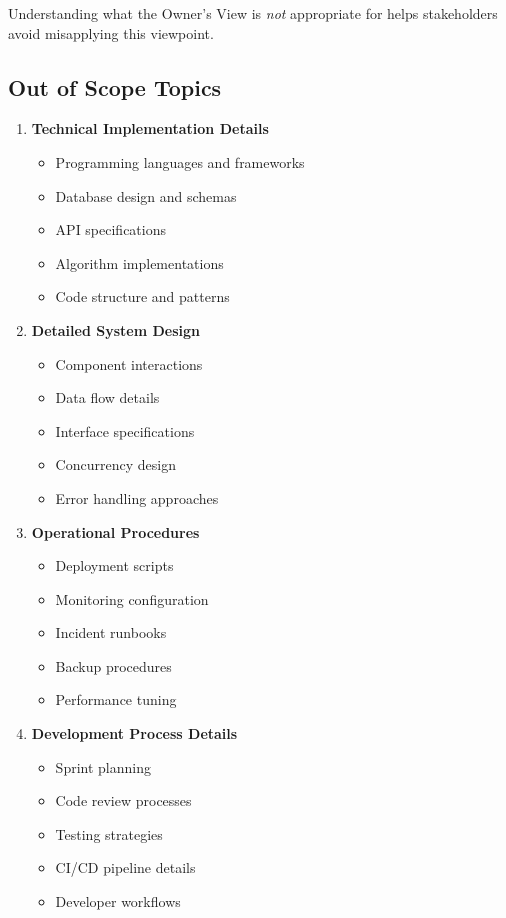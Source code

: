 \documentclass[11pt,letterpaper]{article}
\begin{document}
Understanding what the Owner's View is \emph{not} appropriate for helps stakeholders avoid misapplying this viewpoint.

\subsection{Out of Scope Topics}

\begin{enumerate}[label=\textbf{AC\arabic*:}, leftmargin=2.5em]
    \item \textbf{Technical Implementation Details}
    \begin{itemize}[nosep]
        \item Programming languages and frameworks
        \item Database design and schemas
        \item API specifications
        \item Algorithm implementations
        \item Code structure and patterns
    \end{itemize}
    
    \item \textbf{Detailed System Design}
    \begin{itemize}[nosep]
        \item Component interactions
        \item Data flow details
        \item Interface specifications
        \item Concurrency design
        \item Error handling approaches
    \end{itemize}
    
    \item \textbf{Operational Procedures}
    \begin{itemize}[nosep]
        \item Deployment scripts
        \item Monitoring configuration
        \item Incident runbooks
        \item Backup procedures
        \item Performance tuning
    \end{itemize}
    
    \item \textbf{Development Process Details}
    \begin{itemize}[nosep]
        \item Sprint planning
        \item Code review processes
        \item Testing strategies
        \item CI/CD pipeline details
        \item Developer workflows
    \end{itemize}
    

\end{enumerate}
\end{document}
